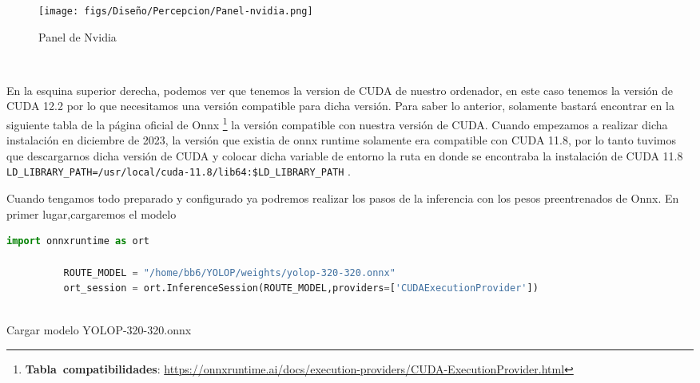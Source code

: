       \begin{figure} [H]
        \begin{center}
          \texttt{[image: figs/Diseño/Percepcion/Panel-nvidia.png]}
        \end{center}
        \caption{Panel de Nvidia}
        \label{fig:Nvidia}
      \end{figure}\

      En la esquina superior derecha, podemos ver que tenemos la version de CUDA de nuestro ordenador, en este caso tenemos la versión de CUDA 12.2 por lo que necesitamos una versión compatible
      para dicha versión. Para saber lo anterior, solamente bastará encontrar en la siguiente tabla de la página oficial de Onnx \footnote{\textbf{Tabla\ compatibilidades}: \url{https://onnxruntime.ai/docs/execution-providers/CUDA-ExecutionProvider.html}} la versión compatible con nuestra versión de CUDA. \newline
      Cuando empezamos a realizar dicha instalación en diciembre de 2023, la versión que existia de onnx runtime solamente era compatible con CUDA 11.8, por lo tanto tuvimos que descargarnos 
      dicha versión de CUDA y colocar dicha variable de entorno la ruta en donde se encontraba la instalación de CUDA 11.8 \texttt{LD\_LIBRARY\_PATH=/usr/local/cuda-11.8/lib64:\$LD\_LIBRARY\_PATH} \break. 

      Cuando tengamos todo preparado y configurado ya podremos realizar los pasos de la inferencia con los pesos preentrenados de Onnx. En primer lugar,cargaremos el modelo
      
      \begin{code}[h]
        \begin{lstlisting}[language=Python]
          import onnxruntime as ort

          ROUTE_MODEL = "/home/bb6/YOLOP/weights/yolop-320-320.onnx"
          ort_session = ort.InferenceSession(ROUTE_MODEL,providers=['CUDAExecutionProvider'])
      
        \end{lstlisting}
        \caption[Cargar modelo]{Cargar modelo YOLOP-320-320.onnx}
        \label{cod:codejemplo}
        \end{code}  

